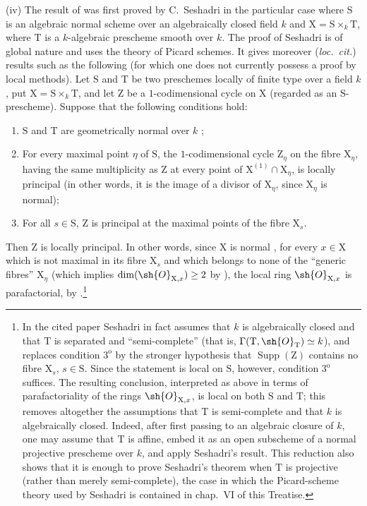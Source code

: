 \begin{env}[21.14.4bis]
\label{IV.21.14.4bis}
(iv) The result of  was first proved by C.~Seshadri \cite{IV-44} in the particular case where $\mathrm{S}$ is an algebraic normal scheme over an algebraically closed field $k$ and $\mathrm{X}=\mathrm{S}\times_k\mathrm{T}$, where $\mathrm{T}$ is a $k$-algebraic prescheme smooth over $k$.
The proof of Seshadri \cite[pp.~188--189]{IV-44} is of global nature and uses the theory of Picard schemes.
It gives moreover (\emph{loc.\ cit.}) results such as the following (for which one does not currently possess a proof by local methods).
Let $\mathrm{S}$ and $\mathrm{T}$ be two preschemes locally of finite type over a field $k$, put $\mathrm{X}=\mathrm{S}\times_k\mathrm{T}$, and let $\mathrm{Z}$ be a $1$-codimensional cycle on $\mathrm{X}$ (regarded as an $\mathrm{S}$-prescheme). Suppose that the following conditions hold:
\begin{enumerate}[label=\arabic*\textsuperscript{o}]
  \item $\mathrm{S}$ and $\mathrm{T}$ are geometrically normal over $k$ ;
  \item For every maximal point $\eta$ of $\mathrm{S}$, the $1$-codimensional cycle $\mathrm{Z}_\eta$ on the fibre $\mathrm{X}_\eta$, having the same multiplicity as $\mathrm{Z}$ at every point of $\mathrm{X}^{(1)}\cap\mathrm{X}_\eta$, is locally principal (in other words, it is the image of a divisor of $\mathrm{X}_\eta$, since $\mathrm{X}_\eta$ is normal);
  \item For all $s\in\mathrm{S}$, $\mathrm{Z}$ is principal at the maximal points of the fibre $\mathrm{X}_s$.
\end{enumerate}
Then $\mathrm{Z}$ is locally principal.
In other words, since $\mathrm{X}$ is normal , for every $x\in\mathrm{X}$ which is not maximal in its fibre $\mathrm{X}_s$ and which belongs to none of the ``generic fibres'' $\mathrm{X}_\eta$ (which implies $\dim(\sh{O}_{\mathrm{X},x})\geq2$ by ), the local ring $\sh{O}_{\mathrm{X},x}$ is parafactorial, by .\footnote{In the cited paper Seshadri in fact assumes that $k$ is algebraically closed and that $\mathrm{T}$ is separated and ``semi-complete'' (that is, $\Gamma(\mathrm{T},\sh{O}_{\mathrm{T}})\simeq k$), and replaces condition $3^{\mathrm{o}}$ by the stronger hypothesis that $\operatorname{Supp}(\mathrm{Z})$ contains no fibre $\mathrm{X}_s$, $s\in\mathrm{S}$. Since the statement is local on $\mathrm{S}$, however, condition $3^{\mathrm{o}}$ suffices. The resulting conclusion, interpreted as above in terms of parafactoriality of the rings $\sh{O}_{\mathrm{X},x}$, is local on both $\mathrm{S}$ and $\mathrm{T}$; this removes altogether the assumptions that $\mathrm{T}$ is semi-complete and that $k$ is algebraically closed. Indeed, after first passing to an algebraic closure of $k$, one may assume that $\mathrm{T}$ is affine, embed it as an open subscheme of a normal projective prescheme over $k$, and apply Seshadri's result. This reduction also shows that it is enough to prove Seshadri's theorem when $\mathrm{T}$ is projective (rather than merely semi-complete), the case in which the Picard-scheme theory used by Seshadri is contained in chap.~VI of this Treatise.}

\end{env}
